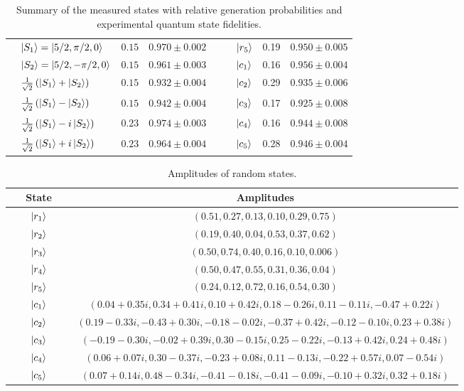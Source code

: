 \begin{table*}[h!]
\begin{tabular}{lcc|lcc}
 $\quad\ket{S_1}=\ket{5/2,\pi /2,0}$   & $0.15$ & $0.970 \pm 0.002\quad$ &$\quad\ket{r_5}$ & 0.19 & $0.950\pm0.005$  \\
 $\quad\ket{S_2}=\ket{5/2,-\pi /2,0}$ & $0.15$ & $0.961 \pm 0.003\quad$ &$\quad\ket{c_1}$ &0.16 & $0.956\pm0.004$ \\
 $\quad\frac{1}{\sqrt{2}}\left(\ket{S_1}+\ket{S_2}\right)$ & $0.15$ & $0.932 \pm 0.004\quad$&$\quad\ket{c_2}$ & 0.29 &$0.935 \pm 0.006$  \\
 $\quad\frac{1}{\sqrt{2}}\left(\ket{S_1}-\ket{S_2}\right)$ & $0.15$ & $0.942 \pm 0.004\quad$& $\quad\ket{c_3}$& 0.17 & $0.925\pm 0.008$ \\
$\quad\frac{1}{\sqrt{2}}\left(\ket{S_1}-i\ket{S_2}\right)$ & $0.23$ & $0.974 \pm 0.003\quad$&$\quad\ket{c_4}$ & 0.16 & $0.944\pm0.008$\\
$\quad\frac{1}{\sqrt{2}}\left(\ket{S_1}+i\ket{S_2}\right)$ & $0.23$ & $0.964 \pm 0.004\quad$& $\quad\ket{c_5}$ & 0.28 & $0.946\pm0.004$\\
\bottomrule
\end{tabular}
\caption{Summary of the measured states with relative generation probabilities and experimental quantum state fidelities. }
\label{table1}
\end{table*}

\begin{table*}[bh!]
\centering
\begin{tabular}{cc}
\toprule
State & Amplitudes \\
\midrule
$\qquad\ket{r_1}\qquad$& $\left( 0.51, 0.27, 0.13, 0.10, 0.29, 0.75\right)$\\
$\qquad\ket{r_2}\qquad$& $\left( 0.19, 0.40, 0.04, 0.53, 0.37, 0.62\right)$\\
$\qquad\ket{r_3}\qquad$&$\left( 0.50, 0.74, 0.40, 0.16, 0.10, 0.006\right)$ \\
$\qquad\ket{r_4}\qquad$& $\left( 0.50, 0.47, 0.55, 0.31, 0.36, 0.04\right)$ \\
$\qquad\ket{r_5}\qquad$& $\left( 0.24, 0.12, 0.72, 0.16, 0.54, 0.30\right)$ \\
$\qquad\ket{c_1}\qquad$& $\left( 0.04+0.35i, 0.34+0.41i, 0.10+0.42i, 0.18-0.26i, 0.11-0.11i, -0.47+0.22i\right)$  \\
$\qquad\ket{c_2}\qquad$& $\left( 0.19-0.33i, -0.43+0.30i, -0.18-0.02i, -0.37+0.42i, -0.12-0.10i, 0.23+0.38i\right)$\\
$\qquad\ket{c_3}\qquad$& $\left( -0.19-0.30i, -0.02+0.39i, 0.30-0.15i, 0.25-0.22i, -0.13+0.42i, 0.24+0.48i\right)$\\
$\qquad\ket{c_4}\qquad$& $\left( 0.06+0.07i, 0.30-0.37i, -0.23+0.08i, 0.11-0.13i, -0.22+0.57i, 0.07-0.54i\right)$\\
$\qquad\ket{c_5}\qquad$& $\left( 0.07+0.14i, 0.48-0.34i, -0.41-0.18i, -0.41-0.09i, -0.10+0.32i, 0.32+0.18i\right)$\\
\bottomrule
\end{tabular}
\caption{Amplitudes of random states.}
\label{table2}
\end{table*}



